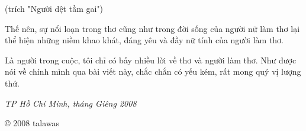 \documentclass[../main.tex]{subfiles}
\begin{document}
\begin{multicols}{2}
\begin{blockquote}
(trích "Người dệt tầm gai")        
 

\end{blockquote}
 
Thế nên, sự nổi loạn trong thơ cũng như trong đời sống của người nữ làm thơ lại thể hiện những niềm khao khát, đáng yêu và đầy nữ tính của người làm thơ.  
 
Là người trong cuộc, tôi chỉ có bấy nhiều lời về thơ và người làm thơ. Như được nói về chính mình qua bài viết này, chắc chắn có yếu kém, rất mong quý vị lượng thứ.  
 
\textit{TP Hồ Chí Minh, tháng Giêng 2008} 
 
© 2008 talawas 
\end{multicols}
\end{document}
